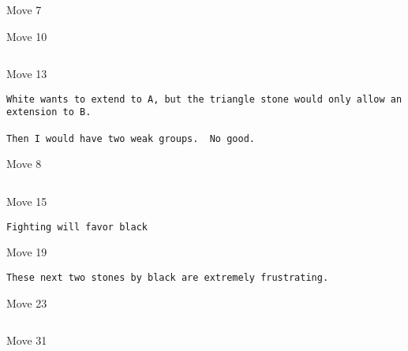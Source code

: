 \documentclass{article}
\begin{document}
\begin{center}
\begin{section}{Move 7}
\end{section}
\begin{section}{Move 10}
\cleargoban
{}
\showfullgoban
\begin{verbatim}
\end{verbatim}
\end{section}
\begin{section}{Move 13}
\cleargoban
{}
\showfullgoban
\begin{verbatim}
White wants to extend to A, but the triangle stone would only allow an extension to B.

Then I would have two weak groups.  No good.\end{verbatim}
\end{section}
\begin{section}{Move 8}
\cleargoban
{}
\showfullgoban
\begin{verbatim}
\end{verbatim}
\end{section}
\begin{section}{Move 15}
\cleargoban
{}
\showfullgoban
\begin{verbatim}
Fighting will favor black\end{verbatim}
\end{section}
\begin{section}{Move 19}
\cleargoban
{}
\showfullgoban
\begin{verbatim}
These next two stones by black are extremely frustrating.\end{verbatim}
\end{section}
\begin{section}{Move 23}
\cleargoban
{}
\showfullgoban
\begin{verbatim}
\end{verbatim}
\end{section}
\begin{section}{Move 31}
\cleargoban
{}

\end{section}
\end{center}
\end{document}
